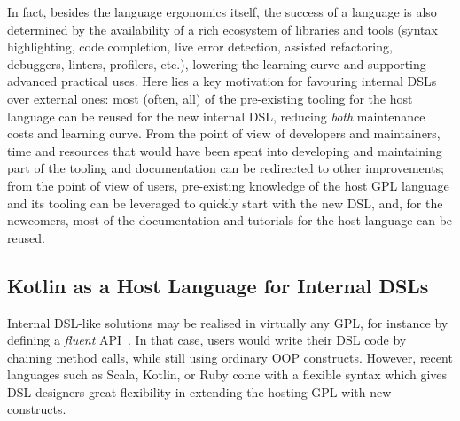 In fact,
besides the language ergonomics itself,
the success of a language is also determined by the availability of a rich ecosystem of libraries and tools
(syntax highlighting, code completion, live error detection, assisted refactoring, debuggers, linters, profilers, etc.),
lowering the learning curve and supporting advanced practical uses.
%
Here lies a key motivation for favouring internal \acp{DSL} over external ones:
most (often, all) of the pre-existing tooling for the host language can be reused for the new internal \ac{DSL},
reducing \emph{both} maintenance costs and learning curve.
%
From the point of view of developers and maintainers,
time and resources that would have been spent into developing and maintaining part of the tooling and documentation can be redirected to other improvements;
from the point of view of users,
pre-existing knowledge of the host \ac{GPL} language and its tooling can be leveraged to quickly start with the new \ac{DSL},
and, for the newcomers, most of the documentation and tutorials for the host language can be reused.

\subsection{Kotlin as a Host Language for Internal \acp{DSL}}
\label{sec:dsl}

Internal \ac{DSL}-like solutions may be realised in virtually any GPL, for instance by defining a \emph{fluent} \ac{API}~\cite{Riti2018}.
%
In that case, users would write their \ac{DSL} code by chaining method calls, while still using ordinary \ac{OOP} constructs.
%
However, recent languages such as Scala, Kotlin, or Ruby come with a flexible syntax which gives \ac{DSL} designers great flexibility in extending the hosting GPL with new constructs.

